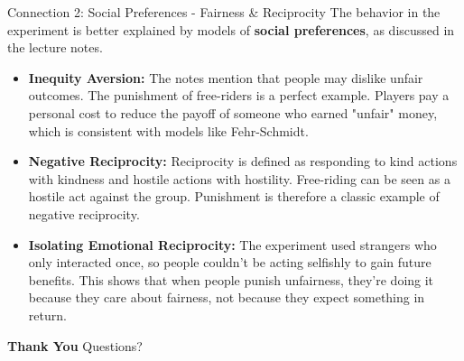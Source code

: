 \documentclass{beamer}
\begin{document}
\begin{frame}{Connection 2: Social Preferences - Fairness \& Reciprocity}
    The behavior in the experiment is better explained by models of \textbf{social preferences}, as discussed in the lecture notes.

    \begin{itemize}
        \item<1-> \textbf{Inequity Aversion:} The notes mention that people may dislike unfair outcomes. The punishment of free-riders is a perfect example. Players pay a personal cost to reduce the payoff of someone who earned "unfair" money, which is consistent with models like Fehr-Schmidt.
        \pause
        \item<2-> \textbf{Negative Reciprocity:} Reciprocity is defined as responding to kind actions with kindness and hostile actions with hostility. Free-riding can be seen as a hostile act against the group. Punishment is therefore a classic example of negative reciprocity.
        \pause
        \item<3-> \textbf{Isolating Emotional Reciprocity:} The experiment used strangers who only interacted once, so people couldn't be acting selfishly to gain future benefits. This shows that when people punish unfairness, they're doing it because they care about fairness, not because they expect something in return.
    \end{itemize}
\end{frame}
\begin{frame}
    \begin{center}
        {\Huge \textbf{Thank You}}
        \vspace{2cm}
        \Large{Questions?}
    \end{center}
\end{frame}
\end{document}
